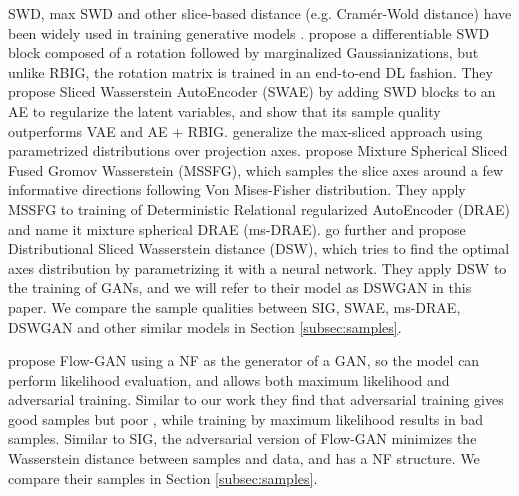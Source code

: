 \documentclass{article}
\begin{document}
SWD, max SWD and other slice-based distance 
(e.g. Cram{\'e}r-Wold distance) 
have been widely used in training generative models \citep{deshpande2018generative, deshpande2019max, wu2019sliced, kolouri2018sliced, knop2018cramer, nguyen2020improving, nguyen2020distributional, nadjahi2020statistical}. \citet{wu2019sliced} propose a differentiable SWD block composed of a rotation followed by marginalized Gaussianizations, but unlike RBIG, the rotation matrix is trained in an end-to-end DL fashion. They propose Sliced Wasserstein AutoEncoder (SWAE) by adding SWD blocks to an AE to regularize the latent variables, and show that its sample quality outperforms VAE and AE + RBIG. \citet{nguyen2020improving, nguyen2020distributional} generalize the max-sliced approach using parametrized distributions over projection axes. \citet{nguyen2020improving} propose Mixture Spherical Sliced Fused Gromov Wasserstein (MSSFG), which samples the slice axes around a few informative directions following Von Mises-Fisher distribution. They apply MSSFG to training of Deterministic Relational regularized AutoEncoder (DRAE) and name it mixture spherical DRAE (ms-DRAE). \citet{nguyen2020distributional} go further and propose Distributional Sliced Wasserstein distance (DSW), which tries to find the optimal axes distribution by parametrizing it with a neural network. They apply DSW to the training of GANs, and we will refer to their model as DSWGAN in this paper. We compare the sample qualities between SIG, SWAE, ms-DRAE, DSWGAN and other similar models in Section \ref{subsec:samples}.

\citet{grover2018flow} propose Flow-GAN using a NF as the generator of a GAN, so the model can perform likelihood evaluation, and allows both maximum likelihood and adversarial training. Similar to our work they find that adversarial training gives good samples but poor , while training by maximum likelihood results in bad samples. Similar to SIG, the adversarial version of Flow-GAN minimizes the Wasserstein distance between samples and data, and has a NF structure. We compare their samples in Section \ref{subsec:samples}.
\end{document}
